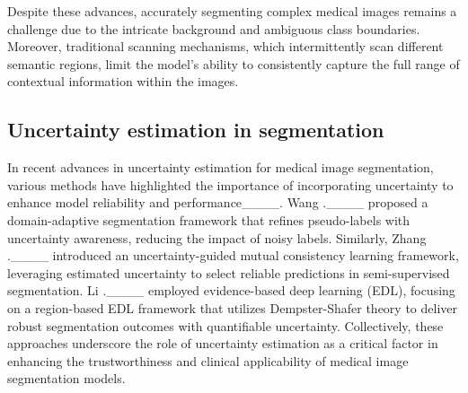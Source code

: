 Despite these advances, accurately segmenting complex medical images remains a challenge due to the intricate background and ambiguous class boundaries. Moreover, traditional scanning mechanisms, which intermittently scan different semantic regions, limit the model's ability to consistently capture the full range of contextual information within the images.

\subsection{Uncertainty estimation in segmentation}
In recent advances in uncertainty estimation for medical image segmentation, various methods have highlighted the importance of incorporating uncertainty to enhance model reliability and performance____. Wang \etal.____ proposed a domain-adaptive segmentation framework that refines pseudo-labels with uncertainty awareness, reducing the impact of noisy labels. Similarly, Zhang \etal.____ introduced an uncertainty-guided mutual consistency learning framework, leveraging estimated uncertainty to select reliable predictions in semi-supervised segmentation. Li \etal.____ employed evidence-based deep learning (EDL), focusing on a region-based EDL framework that utilizes Dempster-Shafer theory to deliver robust segmentation outcomes with quantifiable uncertainty. Collectively, these approaches underscore the role of uncertainty estimation as a critical factor in enhancing the trustworthiness and clinical applicability of medical image segmentation models.

\label{sec:related}